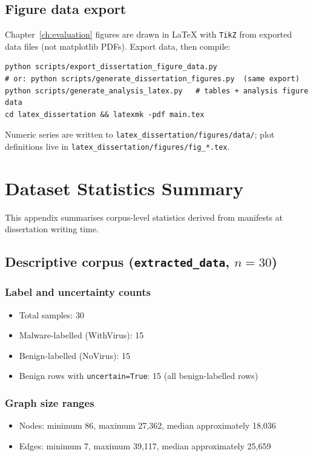 \section{Figure data export}
Chapter~\ref{ch:evaluation} figures are drawn in \LaTeX{} with \texttt{TikZ} from exported data files (not matplotlib PDFs). Export data, then compile:
\begin{verbatim}
python scripts/export_dissertation_figure_data.py
# or: python scripts/generate_dissertation_figures.py  (same export)
python scripts/generate_analysis_latex.py   # tables + analysis figure data
cd latex_dissertation && latexmk -pdf main.tex
\end{verbatim}
Numeric series are written to \texttt{latex\_dissertation/figures/data/}; plot definitions live in \texttt{latex\_dissertation/figures/fig\_*.tex}.

\chapter{Dataset Statistics Summary}
\label{app:stats}

This appendix summarises corpus-level statistics derived from manifests at dissertation writing time.

\section{Descriptive corpus (\texttt{extracted\_data}, $n{=}30$)}

\subsection{Label and uncertainty counts}
\begin{itemize}
\item Total samples: 30
\item Malware-labelled (WithVirus): 15
\item Benign-labelled (NoVirus): 15
\item Benign rows with \texttt{uncertain=True}: 15 (all benign-labelled rows)
\end{itemize}

\subsection{Graph size ranges}
\begin{itemize}
\item Nodes: minimum 86, maximum 27,362, median approximately 18,036
\item Edges: minimum 7, maximum 39,117, median approximately 25,659
\end{itemize}

